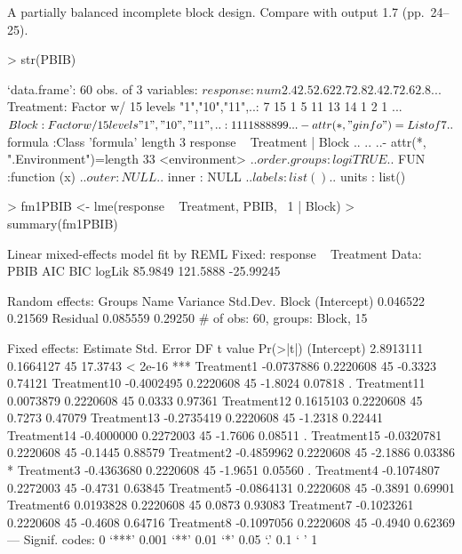 \documentclass[12pt]{article}
\begin{document}
A partially balanced incomplete block design.  Compare with output 1.7
(pp.~24--25).
\begin{Schunk}
\begin{Sinput}
> str(PBIB)
\end{Sinput}
\begin{Soutput}
`data.frame':	60 obs. of  3 variables:
 $ response : num  2.4 2.5 2.6 2 2.7 2.8 2.4 2.7 2.6 2.8 ...
 $ Treatment: Factor w/ 15 levels "1","10","11",..: 7 15 1 5 11 13 14 1 2 1 ...
 $ Block    : Factor w/ 15 levels "1","10","11",..: 1 1 1 1 8 8 8 8 9 9 ...
 - attr(*, "ginfo")=List of 7
  ..$ formula     :Class 'formula' length 3 response ~ Treatment | Block
  .. .. ..- attr(*, ".Environment")=length 33 <environment> 
  ..$ order.groups: logi TRUE
  ..$ FUN         :function (x)  
  ..$ outer       : NULL
  ..$ inner       : NULL
  ..$ labels      : list()
  ..$ units       : list()
\end{Soutput}
\begin{Sinput}
> fm1PBIB <- lme(response ~ Treatment, PBIB, ~1 | Block)
> summary(fm1PBIB)
\end{Sinput}
\begin{Soutput}
Linear mixed-effects model fit by REML
Fixed: response ~ Treatment 
 Data: PBIB 
     AIC      BIC    logLik
 85.9849 121.5888 -25.99245

Random effects:
 Groups   Name        Variance Std.Dev.
 Block    (Intercept) 0.046522 0.21569 
 Residual             0.085559 0.29250 
# of obs: 60, groups: Block, 15

Fixed effects:
              Estimate Std. Error DF t value Pr(>|t|)    
(Intercept)  2.8913111  0.1664127 45 17.3743  < 2e-16 ***
Treatment1  -0.0737886  0.2220608 45 -0.3323  0.74121    
Treatment10 -0.4002495  0.2220608 45 -1.8024  0.07818 .  
Treatment11  0.0073879  0.2220608 45  0.0333  0.97361    
Treatment12  0.1615103  0.2220608 45  0.7273  0.47079    
Treatment13 -0.2735419  0.2220608 45 -1.2318  0.22441    
Treatment14 -0.4000000  0.2272003 45 -1.7606  0.08511 .  
Treatment15 -0.0320781  0.2220608 45 -0.1445  0.88579    
Treatment2  -0.4859962  0.2220608 45 -2.1886  0.03386 *  
Treatment3  -0.4363680  0.2220608 45 -1.9651  0.05560 .  
Treatment4  -0.1074807  0.2272003 45 -0.4731  0.63845    
Treatment5  -0.0864131  0.2220608 45 -0.3891  0.69901    
Treatment6   0.0193828  0.2220608 45  0.0873  0.93083    
Treatment7  -0.1023261  0.2220608 45 -0.4608  0.64716    
Treatment8  -0.1097056  0.2220608 45 -0.4940  0.62369    
---
Signif. codes:  0 `***' 0.001 `**' 0.01 `*' 0.05 `.' 0.1 ` ' 1 


\end{Soutput}
\end{Schunk}
\end{document}

